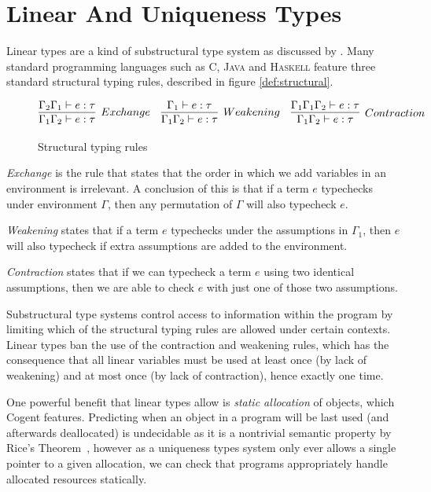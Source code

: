 \section{Linear And Uniqueness Types}

Linear types are a kind of substructural type system as discussed by \citet{Substructural}.
Many standard programming languages such as \textsc{C}, \textsc{Java} and \textsc{Haskell} feature
three standard structural typing rules, described in figure \autoref{def:structural}.

\begin{figure}
    \centering
    $$
        \infer[Exchange]{
            \Gamma_1\Gamma_2 \vdash e : \tau
        }{
            \Gamma_2\Gamma_1 \vdash e : \tau
        }\quad
        \infer[Weakening]{
            \Gamma_1\Gamma_2 \vdash e : \tau
        }{
            \Gamma_1 \vdash e : \tau
        }\quad
        \infer[Contraction]{
            \Gamma_1\Gamma_2 \vdash e : \tau
        }{
            \Gamma_1\Gamma_1\Gamma_2 \vdash e : \tau
        }
    $$
    \caption{Structural typing rules}
    \label{def:structural}
\end{figure}

\textit{Exchange} is the rule that states that the order in which we add variables in an environment
is irrelevant. A conclusion of this is that if a term $e$ typechecks under environment $\Gamma$,
then any permutation of $\Gamma$ will also typecheck $e$.

\textit{Weakening} states that if a term $e$ typechecks under the assumptions
in $\Gamma_1$, then $e$ will also typecheck if extra assumptions are added to the environment.

\textit{Contraction} states that if we can typecheck a term $e$ using two identical
assumptions, then we are able to check $e$ with just one of those two assumptions.

Substructural type systems control access to information within the program by limiting which
of the structural typing rules are allowed under certain contexts. Linear types ban the use of the
contraction and weakening rules, which has the consequence that all linear variables must be used 
at least once (by lack of weakening) and at most once (by lack of contraction), hence exactly one time.

One powerful benefit that linear types allow is \textit{static allocation} of objects, which Cogent
features. Predicting when an object in a program will be last used (and afterwards deallocated)
is undecidable as it is a nontrivial semantic property by Rice's Theorem~\citep{Sipser},
however as a uniqueness types system only ever allows a single pointer to a given allocation, we
can check that programs appropriately handle allocated resources statically.

